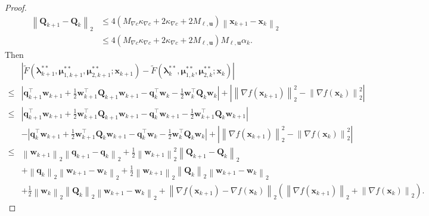 \documentclass[aos]{imsart}
\numberwithin{equation}{section}
\theoremstyle{plain}
\begin{document}
\begin{appendix}
\begin{proof}
\begin{equation}
    \label{eq21}
        \begin{split}
            \left\| \bm{Q}_{k+1} - \bm{Q}_{k} \right\|_2 & \leq 4 \left( M_{\nabla c} \kappa_{\nabla c} + 2 \kappa_{\nabla c} + 2 M_{\bm{\ell},\bm{u}} \right) \left\| \bm{x}_{k+1} - \bm{x}_{k} \right\|_2\\
            & \leq 4 \left( M_{\nabla c} \kappa_{\nabla c} + 2 \kappa_{\nabla c} + 2 M_{\bm{\ell},\bm{u}} \right) M_{\bm{\ell},\bm{u}} \alpha_k.
        \end{split}
    \end{equation}
    Then 
    \begin{equation*}
        \begin{split}
            & \left|  \widetilde{F}(\bm{\lambda}_{k+1}^{**}, \bm{\mu}_{1,k+1}^{**}, \bm{\mu}_{2,k+1}^{**}; \bm{x}_{k+1}) -  \widetilde{F}(\bm{\lambda}_{k}^{**}, \bm{\mu}_{1,k}^{**}, \bm{\mu}_{2,k}^{**}; \bm{x}_{k}) \right| \\
            \leq & \left| \bm{q}_{k+1}^{\top} \bm{w}_{k+1} + \frac{1}{2} \bm{w}^{\top}_{k+1} \bm{Q}_{k+1} \bm{w}_{k+1} - \bm{q}_{k}^{\top} \bm{w}_{k} - \frac{1}{2} \bm{w}^{\top}_{k} \bm{Q}_{k} \bm{w}_{k} \right| + \left| \left\| \nabla f(\bm{x}_{k+1}) \right\|_2^2 - \left\| \nabla f(\bm{x}_{k}) \right\|_2^2 \right|\\
            \leq & \left| \bm{q}_{k+1}^{\top} \bm{w}_{k+1} + \frac{1}{2} \bm{w}^{\top}_{k+1} \bm{Q}_{k+1} \bm{w}_{k+1} - \bm{q}_{k}^{\top} \bm{w}_{k+1} - \frac{1}{2} \bm{w}^{\top}_{k+1} \bm{Q}_{k} \bm{w}_{k+1} \right|\\
            & - \left| \bm{q}_{k}^{\top} \bm{w}_{k+1} + \frac{1}{2} \bm{w}^{\top}_{k+1} \bm{Q}_{k} \bm{w}_{k+1} - \bm{q}_{k}^{\top} \bm{w}_{k} - \frac{1}{2} \bm{w}^{\top}_{k} \bm{Q}_{k} \bm{w}_{k} \right| + \left| \left\| \nabla f(\bm{x}_{k+1}) \right\|_2^2 - \left\| \nabla f(\bm{x}_{k}) \right\|_2^2 \right|\\
            \leq & \left\|\bm{w}_{k+1} \right\|_2 \left\| \bm{q}_{k+1} - \bm{q}_{k} \right\|_2  + \frac{1}{2} \left\| \bm{w}_{k+1} \right\|_2^2 \left\| \bm{Q}_{k+1} - \bm{Q}_{k} \right\|_2 \\
            & + \left\| \bm{q}_{k} \right\|_2 \left\| \bm{w}_{k+1} - \bm{w}_{k} \right\|_2 + \frac{1}{2} \left\| \bm{w}_{k+1} \right\|_2  \left\| \bm{Q}_{k} \right\|_2  \left\| \bm{w}_{k+1} - \bm{w}_{k} \right\|_2 \\
            & + \frac{1}{2} \left\| \bm{w}_{k} \right\|_2 \left\| \bm{Q}_{k} \right\|_2 \left\| \bm{w}_{k+1} - \bm{w}_{k} \right\|_2 +  \left\| \nabla f(\bm{x}_{k+1}) - \nabla f(\bm{x}_{k}) \right\|_2    \left( \left\| \nabla f(\bm{x}_{k+1}) \right\|_2  + \left\| \nabla f(\bm{x}_{k}) \right\|_2\right).

\end{split}
\end{equation*}
\end{proof}
\end{appendix}
\end{document}
